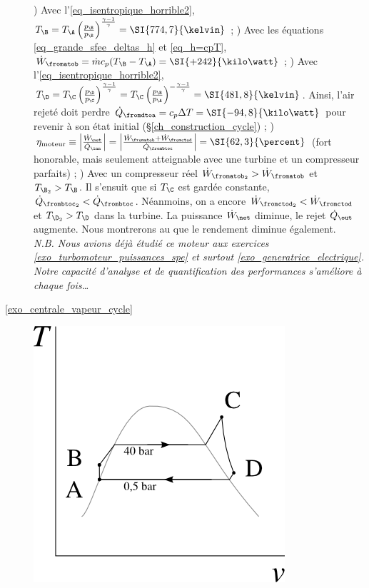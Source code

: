 \begin{description}
			) Avec l’\cref{eq_isentropique_horrible2}, $T_\B = T_\A \left(\frac{p_\B}{p_\B}\right)^{\frac{\gamma - 1}{\gamma}} = \SI{774,7}{\kelvin}$ ;
			) Avec les équations \ref{eq_grande_sfee_deltas_h} et \ref{eq_h=cpT}, $\dot W_\fromatob = \dot m c_p (T_\B - T_\A) = \SI{+242}{\kilo\watt}$  ;
			) Avec l’\cref{eq_isentropique_horrible2}, $T_\D = T_\C \left(\frac{p_\D}{p_\C}\right)^{\frac{\gamma - 1}{\gamma}} = T_\C \left(\frac{p_\B}{p_\A}\right)^{-\frac{\gamma - 1}{\gamma}} = \SI{481,8}{\kelvin}$. Ainsi, l’air rejeté doit perdre $\dot Q_\fromdtoa = c_p \Delta T = \SI{-94,8}{\kilo\watt}$ pour revenir à son état initial (\S\ref{ch_construction_cycle}) ;
			) $\eta_\text{moteur} \equiv \left|\frac{\dot W_\net}{\dot Q_\inn} \right| = \left|\frac{\dot W_\fromatob + \dot W_\fromctod}{\dot Q_\frombtoc} \right| = \SI{62,3}{\percent} $ (fort honorable, mais seulement atteignable avec une turbine et un compresseur parfaits) ;
			) Avec un compresseur réel $\dot W_{\fromatob_2} > \dot W_\fromatob$ et $T_{\B_2} > T_\B$.
						Il s’ensuit que si $T_\C$ est gardée constante, $\dot Q_{\frombtoc_2} < \dot Q_\frombtoc$.
						Néanmoins, on a encore $\dot W_{\fromctod_2} < \dot W_\fromctod$ et $T_{\D_2} > T_\D$ dans la turbine. La puissance $\dot W_\net$ diminue, le rejet $\dot Q_\out$ augmente. Nous montrerons au \courssept que le rendement diminue également.\\
					\textit{N.B. Nous avions déjà étudié ce moteur aux exercices \ref{exo_turbomoteur_puissances_spe} et surtout \ref{exo_generatrice_electrique}. Notre capacité d’analyse et de quantification des performances s’améliore à chaque fois…}		
	\item [\ref{exo_centrale_vapeur_cycle}] 
			\includegraphics[height=\solutiondiagramwidth]{images/exo_sol_tv_moteur_vapeur.png}

\end{description}

